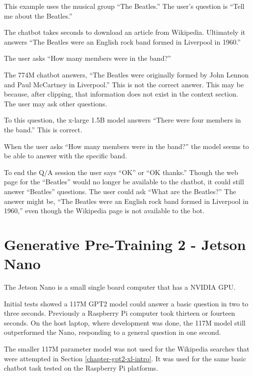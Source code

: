 This example uses the musical group ``The Beatles.'' The user's question is ``Tell me about the Beatles.''

The chatbot takes seconds to download an article from Wikipedia. Ultimately it answers ``The Beatles were an English rock band formed in Liverpool in 1960.''

The user asks ``How many members were in the band?''

The 774M chatbot answers, ``The Beatles were originally formed by John Lennon and Paul McCartney in Liverpool.'' This is not the correct answer. This may be because, after clipping, that information does not exist in the context section. The user may ask other questions. %

To this question, the x-large 1.5B model answers ``There were four members in the band.'' This is correct.

When the user asks ``How many members were in the band?'' the model seems to be able to answer with the specific band. %

To end the Q/A session the user says ``OK'' or ``OK thanks.'' Though the web page for the ``Beatles'' would no longer be available to the chatbot, it could still answer ``Beatles''  questions. The user could ask ``What are the Beatles?'' The answer might be, ``The Beatles were an English rock band formed in Liverpool in 1960,'' even though the Wikipedia page is not available to the bot.

\label{chapter-xlarge}

\section{Generative Pre-Training 2 - Jetson Nano}

\label{chapter-nano}
The Jetson Nano is a small single board computer that has a NVIDIA GPU. %

Initial tests showed a 117M GPT2 model could answer a basic question in two to three seconds. Previously a Raspberry Pi computer took thirteen or fourteen seconds. On the host laptop, where development was done, the 117M model still outperformed the Nano, responding to a general question in one second.

The smaller 117M parameter model was not used for the Wikipedia searches that were attempted in Section \ref{chapter-gpt2-xl-intro}. It was used for the same basic chatbot task tested on the Raspberry Pi platforms.

